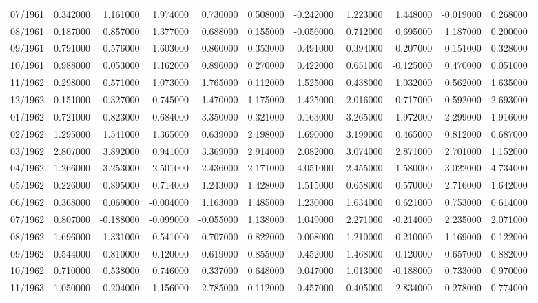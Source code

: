 \begin{tabular}{lrrrrrrrrrr}
07/1961 & 0.342000 & 1.161000 & 1.974000 & 0.730000 & 0.508000 & -0.242000 & 1.223000 & 1.448000 & -0.019000 & 0.268000 \\
08/1961 & 0.187000 & 0.857000 & 1.377000 & 0.688000 & 0.155000 & -0.056000 & 0.712000 & 0.695000 & 1.187000 & 0.200000 \\
09/1961 & 0.791000 & 0.576000 & 1.603000 & 0.860000 & 0.353000 & 0.491000 & 0.394000 & 0.207000 & 0.151000 & 0.328000 \\
10/1961 & 0.988000 & 0.053000 & 1.162000 & 0.896000 & 0.270000 & 0.422000 & 0.651000 & -0.125000 & 0.470000 & 0.051000 \\
11/1962 & 0.298000 & 0.571000 & 1.073000 & 1.765000 & 0.112000 & 1.525000 & 0.438000 & 1.032000 & 0.562000 & 1.635000 \\
12/1962 & 0.151000 & 0.327000 & 0.745000 & 1.470000 & 1.175000 & 1.425000 & 2.016000 & 0.717000 & 0.592000 & 2.693000 \\
01/1962 & 0.721000 & 0.823000 & -0.684000 & 3.350000 & 0.321000 & 0.163000 & 3.265000 & 1.972000 & 2.299000 & 1.916000 \\
02/1962 & 1.295000 & 1.541000 & 1.365000 & 0.639000 & 2.198000 & 1.690000 & 3.199000 & 0.465000 & 0.812000 & 0.687000 \\
03/1962 & 2.807000 & 3.892000 & 0.941000 & 3.369000 & 2.914000 & 2.082000 & 3.074000 & 2.871000 & 2.701000 & 1.152000 \\
04/1962 & 1.266000 & 3.253000 & 2.501000 & 2.436000 & 2.171000 & 4.051000 & 2.455000 & 1.580000 & 3.022000 & 4.734000 \\
05/1962 & 0.226000 & 0.895000 & 0.714000 & 1.243000 & 1.428000 & 1.515000 & 0.658000 & 0.570000 & 2.716000 & 1.642000 \\
06/1962 & 0.368000 & 0.069000 & -0.004000 & 1.163000 & 1.485000 & 1.230000 & 1.634000 & 0.621000 & 0.753000 & 0.614000 \\
07/1962 & 0.807000 & -0.188000 & -0.099000 & -0.055000 & 1.138000 & 1.049000 & 2.271000 & -0.214000 & 2.235000 & 2.071000 \\
08/1962 & 1.696000 & 1.331000 & 0.541000 & 0.707000 & 0.822000 & -0.008000 & 1.210000 & 0.210000 & 1.169000 & 0.122000 \\
09/1962 & 0.544000 & 0.810000 & -0.120000 & 0.619000 & 0.855000 & 0.452000 & 1.468000 & 0.120000 & 0.657000 & 0.882000 \\
10/1962 & 0.710000 & 0.538000 & 0.746000 & 0.337000 & 0.648000 & 0.047000 & 1.013000 & -0.188000 & 0.733000 & 0.970000 \\
11/1963 & 1.050000 & 0.204000 & 1.156000 & 2.785000 & 0.112000 & 0.457000 & -0.405000 & 2.834000 & 0.278000 & 0.774000 \\

\end{tabular}
